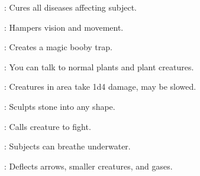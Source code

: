 \begin{multicols}{2}
\begin{description*}
\item[\linkspell{Remove Disease}:] Cures all diseases affecting subject.
\item[\linkspell{Sleet Storm}:] Hampers vision and movement.
\item[\linkspell{Snare}:] Creates a magic booby trap.
\item[\linkspell{Speak with Plants}:] You can talk to normal plants and plant creatures.
\item[\linkspell{Spike Growth}:] Creatures in area take 1d4 damage, may be slowed.
\item[\linkspell{Stone Shape}:] Sculpts stone into any shape.
\item[\linkspell{Summon Nature’s Ally III}:] Calls creature to fight.
\item[\linkspell{Water Breathing}:] Subjects can breathe underwater.
\item[\linkspell{Wind Wall}:] Deflects arrows, smaller creatures, and gases.
\end{description*}


\end{multicols}
